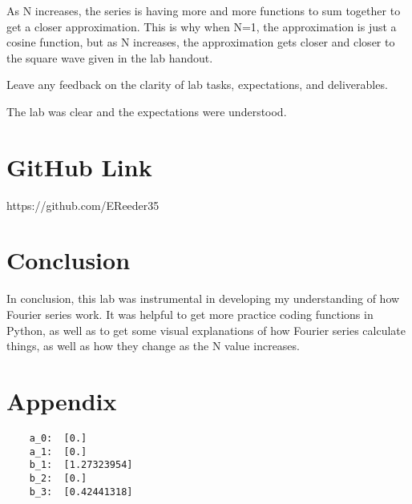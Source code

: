 \documentclass[12pt]{article}
\begin{document}
As N increases, the series is having more and more functions to sum together to get a closer approximation. This is why when N=1, the approximation is just a cosine function, but as N increases, the approximation gets closer and closer to the square wave given in the lab handout.

Leave any feedback on the clarity of lab tasks, expectations, and deliverables.

The lab was clear and the expectations were understood.

\section{GitHub Link}

https://github.com/EReeder35

\section{Conclusion}

In conclusion, this lab was instrumental in developing my understanding of how Fourier series work. It was helpful to get more practice coding functions in Python, as well as to get some visual explanations of how Fourier series calculate things, as well as how they change as the N value increases.

\newpage

\section{Appendix}
\begin{lstlisting}
    a_0:  [0.]
    a_1:  [0.]
    b_1:  [1.27323954]
    b_2:  [0.]
    b_3:  [0.42441318]
\end{lstlisting}
\end{document}
